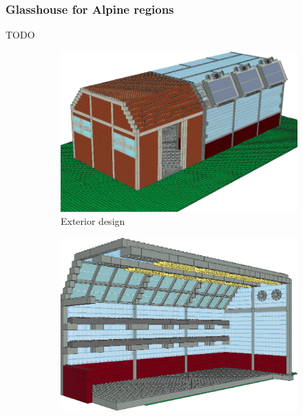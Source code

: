 \documentclass{PDS}
\begin{document}
\subsubsection{Glasshouse for Alpine regions}
\label{sec:master-product-lego}

TODO

\begin{figure}[htbp]
    \centering
    \begin{subfigure}[b]{0.3\textwidth}
        \centering
        \includegraphics[width=\textwidth]{./figures/glasshouse_1.png}
        \caption{Exterior design}
        \label{fig:glasshouse_1}
    \end{subfigure}
    \hfill
    \begin{subfigure}[b]{0.3\textwidth}
        \centering
        \includegraphics[width=\textwidth]{./figures/glasshouse_2.png}

\end{subfigure}
\end{figure}
\end{document}
